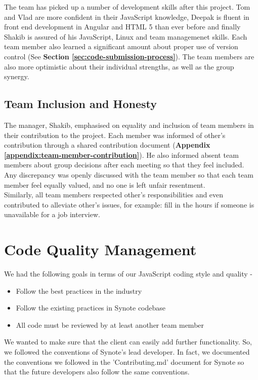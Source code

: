The team has picked up a number of development skills after this project. Tom and Vlad are more confident in their JavaScript knowledge, Deepak is fluent in front end development in Angular and HTML 5 than ever before and finally Shakib is assured of his JavaScript, Linux and team managemenet skills. Each team member also learned a significant amount about proper use of version control (See \textbf{Section \ref{sec:code-submission-process}}). The team members are also more optimistic about their individual strengths, as well as the group synergy.

\subsection{Team Inclusion and Honesty}
\label{subsec:team-inclusion}
The manager, Shakib, emphasised on equality and inclusion of team members in their contribution to the project. Each member was informed of other's contribution through a shared contribution document (\textbf{Appendix \ref{appendix:team-member-contribution}}). He also informed absent team members about group decisions after each meeting so that they feel included. Any discrepancy was openly discussed with the team member so that each team member feel equally valued, and no one is left unfair resentment.\\

Similarly, all team members respected other's responsibilities and even contributed to alleviate other's issues, for example: fill in the hours if someone is unavailable for a job interview.

\section{Code Quality Management}
\label{sec:code-quality-management}

We had the following goals in terms of our JavaScript coding style and quality -

\begin{itemize}

  \item Follow the best practices in the industry
  \item Follow the existing practices in Synote codebase
  \item All code must be reviewed by at least another team member

\end{itemize}

We wanted to make sure that the client can easily add further functionality. So, we followed the conventions of Synote's lead developer. In fact, we documented the conventions we followed in the 'Contributing.md' document for Synote so that the future developers also follow the same conventions.\\

